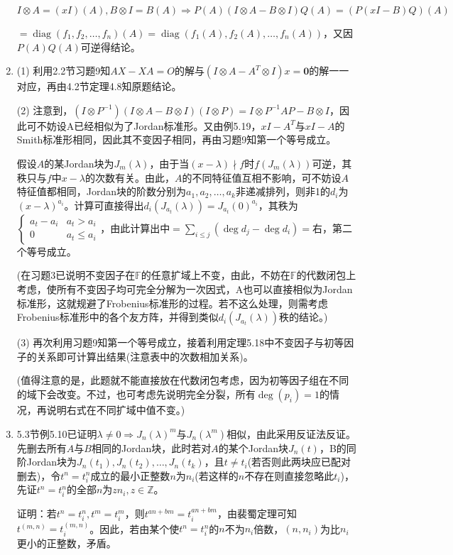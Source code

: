 \documentclass[a4paper,UTF8,fontset=windows]{ctexart}
\DeclareMathOperator{\diag}{diag}
\begin{document}
\begin{enumerate}
$I\otimes A=(xI)(A),B\otimes I=B(A)\Rightarrow P(A)(I\otimes A-B\otimes I)Q(A)=(P(xI-B)Q)(A)$

$=\diag(f_1,f_2,\dots,f_n)(A)=\diag(f_1(A),f_2(A),\dots,f_n(A))$，又因$P(A)Q(A)$可逆得结论。

\item
(1) 利用2.2节习题9知$AX-XA=O$的解与$(I\otimes A-A^T\otimes I)x=\mathbf{0}$的解一一对应，再由4.2节定理4.8知原题结论。

(2) 注意到，$(I\otimes P^{-1})(I\otimes A-B\otimes I)(I\otimes P)=I\otimes P^{-1}AP-B\otimes I$，因此可不妨设A已经相似为了Jordan标准形。又由例5.19，$xI-A^T$与$xI-A$的Smith标准形相同，因此其不变因子相同，再由习题9知第一个等号成立。

假设$A$的某Jordan块为$J_m(\lambda)$，由于当$(x-\lambda)\nmid f$时$f(J_m(\lambda))$可逆，其秩只与$f$中$x-\lambda$的次数有关。由此，$A$的不同特征值互相不影响，可不妨设$A$特征值都相同，Jordan块的阶数分别为$a_1,a_2,\dots,a_k$非递减排列，则非1的$d_i$为$(x-\lambda)^{a_i}$。计算可直接得出$d_i(J_{a_t}(\lambda))=J_{a_t}(0)^{a_i}$，其秩为$\begin{cases}a_t-a_i&a_t>a_i\\0&a_t\le a_i\end{cases}$，由此计算出中$=\sum_{i\le j}(\deg{d_j}-\deg{d_i})=$右，第二个等号成立。

(在习题3已说明不变因子在$\mathbb{F}$的任意扩域上不变，由此，不妨在$\mathbb{F}$的代数闭包上考虑，使所有不变因子均可完全分解为一次因式，A也可以直接相似为Jordan标准形，这就规避了Frobenius标准形的过程。若不这么处理，则需考虑Frobenius标准形中的各个友方阵，并得到类似$d_i(J_{a_t}(\lambda))$秩的结论。)

(3) 再次利用习题9知第一个等号成立，接着利用定理5.18中不变因子与初等因子的关系即可计算出结果(注意表中的次数相加关系)。

(值得注意的是，此题就不能直接放在代数闭包考虑，因为初等因子组在不同的域下会改变。不过，也可考虑先说明完全分裂，所有$\deg(p_i)=1$的情况，再说明右式在不同扩域中值不变。)

\item
5.3节例5.10已证明$\lambda\ne0\Rightarrow J_n(\lambda)^m$与$J_n(\lambda^m)$相似，由此采用反证法反证。先删去所有$A$与$B$相同的Jordan块，此时若对$A$的某个Jordan块$J_n(t)$，B的同阶Jordan块为$J_n(t_1),J_n(t_2),\dots,J_n(t_k)$，且$t\ne t_i$(若否则此两块应已配对删去)，令$t^n=t_i^n$成立的最小正整数$n$为$n_i$(若这样的$n$不存在则直接忽略此$t_i$)，先证$t^n=t_i^n$的全部$n$为$zn_i,z\in\mathbb{Z}$。

证明：若$t^n=t_i^n,t^m=t_i^m$，则$t^{an+bm}=t_i^{an+bm}$，由裴蜀定理可知$t^{(m,n)}=t_i^{(m,n)}$。因此，若由某个使$t^n=t_i^n$的$n$不为$n_i$倍数，$(n,n_i)$为比$n_i$更小的正整数，矛盾。


\end{enumerate}
\end{document}
